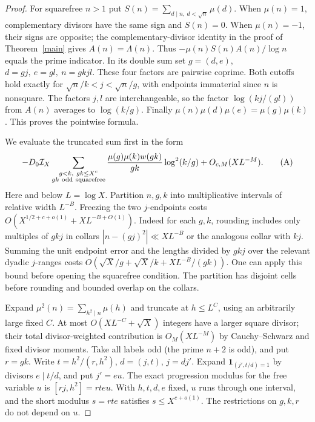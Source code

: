 \documentclass[11pt]{article}
\begin{document}
\begin{proof}
For squarefree \(n>1\) put \(S(n)=\sum_{d\mid n,\ d<\sqrt n}\mu(d)\).
When \(\mu(n)=1\), complementary divisors have the same sign and \(S(n)=0\).
When \(\mu(n)=-1\), their signs are opposite; the complementary-divisor identity
in the proof of Theorem~\ref{main} gives \(A(n)=\Lambda(n)\).
Thus \(-\mu(n)S(n)A(n)/\log n\) equals the prime indicator.
In its double sum set \(g=(d,e)\), \(d=gj,\ e=gl,\ n=gkjl\).
These four factors are pairwise coprime. Both cutoffs hold exactly for
\(\sqrt n/k<j<\sqrt n/g\), with endpoints immaterial since \(n\) is nonsquare.
The factors \(j,l\) are interchangeable, so the factor
\(\log(kj/(gl))\) from \(A(n)\) averages to \(\log(k/g)\).
Finally \(\mu(n)\mu(d)\mu(e)=\mu(g)\mu(k)\).
This proves the pointwise formula.

We evaluate the truncated sum first in the form
\[
 -D_0{\cal I}_X
 \sum_{\substack{g<k,\ gk\le X^c\\gk\ {\rm odd\ squarefree}}}
 \frac{\mu(g)\mu(k)w(gk)}{gk}\log^2(k/g)+O_{c,M}(XL^{-M}). \tag{A}
\]
Here and below \(L=\log X\).
Partition \(n,g,k\) into multiplicative intervals of relative width \(L^{-B}\).
Freezing the two \(j\)-endpoints costs \(O(X^{1/2+c+o(1)}+XL^{-B+O(1)})\).
Indeed for each \(g,k\), rounding includes only multiples of \(gkj\)
in collars \(|n-(gj)^2|\ll XL^{-B}\) or the analogous collar with \(kj\).
Summing the unit endpoint error and the lengths divided by \(gkj\) over
the relevant dyadic \(j\)-ranges costs
\(O(\sqrt X/g+\sqrt X/k+XL^{-B}/(gk))\).
One can apply this bound before opening the squarefree condition. The
partition has disjoint cells before rounding and bounded overlap on the collars.

Expand \(\mu^2(n)=\sum_{h^2\mid n}\mu(h)\) and truncate at \(h\le L^C\),
using an arbitrarily large fixed \(C\). At most \(O(XL^{-C}+\sqrt X)\)
integers have a larger square divisor; their total divisor-weighted contribution
is \(O_M(XL^{-M})\) by Cauchy--Schwarz and fixed divisor moments.
Take all labels odd (the prime \(n+2\) is odd), and put \(r=gk\).
Write \(t=h^2/(r,h^2)\), \(d=(j,t)\), \(j=dj'\). Expand
\(\mathbf1_{(j',t/d)=1}\) by divisors \(e\mid t/d\), and put \(j'=eu\).
The exact progression modulus for the free variable \(u\) is
\([rj,h^2]=rteu\). With \(h,t,d,e\) fixed, \(u\) runs through one interval,
and the short modulus \(s=rte\) satisfies \(s\le X^{c+o(1)}\).
The restrictions on \(g,k,r\) do not depend on \(u\).


\end{proof}
\end{document}
